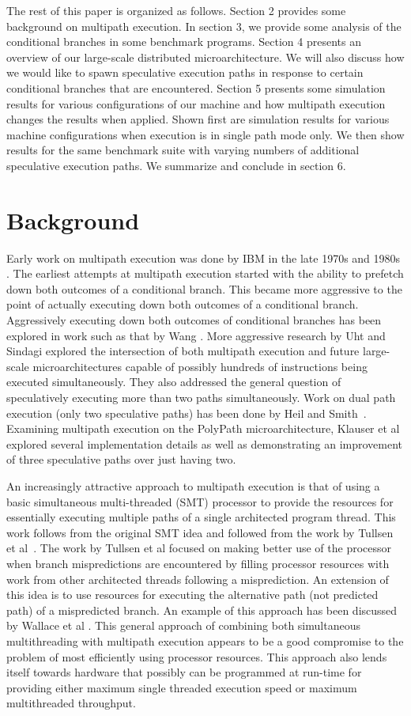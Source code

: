 \documentclass[10pt,dvips]{article}
\begin{document}
The rest of this paper is organized as follows.
Section 2 provides some background on multipath execution.
In section 3, we provide some analysis of the conditional
branches in some benchmark programs.  
Section 4 presents an overview of our large-scale distributed
microarchitecture.
We will also discuss how we
would like to 
spawn speculative execution paths
in response to certain conditional branches that 
are encountered.
Section 5 presents some simulation results for various
configurations of our machine and how multipath execution
changes the results when applied.  Shown first are simulation
results for various machine configurations when execution is in
single path mode only.  We then show results for
the same benchmark suite with varying numbers of additional
speculative execution paths.
We summarize and conclude in section 6.
%
\section{Background}
%
Early work on multipath execution was
done by IBM in the
late 1970s and 1980s \cite{Conners79}.
The earliest attempts at multipath
execution started with the ability to prefetch down both
outcomes of a conditional branch.  This became more aggressive
to the point of actually executing down both outcomes of
a conditional branch.  Aggressively executing down both outcomes
of conditional branches has been explored in work such as that by
Wang \cite{Wang90}.  
More aggressive research by Uht and
Sindagi \cite{Uht95} explored the intersection of both
multipath execution and future large-scale microarchitectures
capable of possibly hundreds of instructions being executed simultaneously.
They also addressed the general question of speculatively executing
more than two paths simultaneously.
Work on dual path execution (only two speculative paths) has
been done by Heil and Smith~\cite{Heil96}.
Examining multipath execution on the PolyPath microarchitecture,
Klauser et al explored several implementation details
as well as demonstrating an improvement of three speculative paths
over just having two.

An increasingly attractive approach to multipath execution is that
of using a basic simultaneous multi-threaded (SMT) processor
to provide the resources for essentially executing multiple paths
of a single architected program thread.  This work follows from
the original SMT idea and followed from the work by
Tullsen et al~\cite{Tullsen96}.  
The work by Tullsen et al focused
on making better use of the processor when
branch mispredictions are encountered by filling processor resources with
work from other architected threads following a misprediction.
An extension of this idea is to use resources for executing
the alternative path (not predicted path) of a mispredicted branch.
An example of this approach has been discussed by 
Wallace et al \cite{Wallace98}.  This general approach of combining
both simultaneous multithreading with multipath execution appears
to be a good compromise to the problem of most efficiently using
processor resources.  This approach also lends itself towards
hardware that possibly can be programmed at run-time for providing either
maximum single threaded execution speed or maximum multithreaded throughput.
\end{document}
